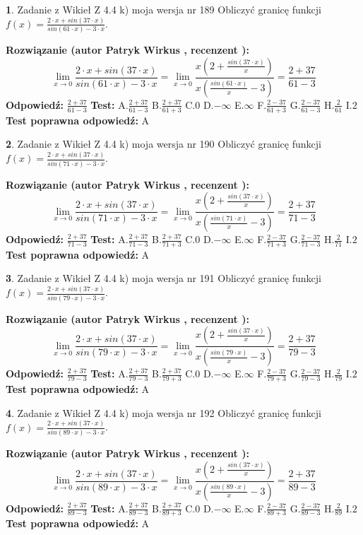 \documentclass[12pt, a4paper]{article}
\theoremstyle{definition} %
\newtheorem{zad}{}
\newcommand{\zadStart}[1]{\begin{zad}#1\newline}
\newcommand{\zadStop}{\end{zad}}
\newcommand{\rozwStart}[2]{\noindent \textbf{Rozwiązanie (autor #1 , recenzent #2): }\newline}
\newcommand{\rozwStop}{\newline}
\newcommand{\odpStart}{\noindent \textbf{Odpowiedź:}\newline}
\newcommand{\odpStop}{\newline}
\newcommand{\testStart}{\noindent \textbf{Test:}\newline}
\newcommand{\testStop}{\newline}
\newcommand{\kluczStart}{\noindent \textbf{Test poprawna odpowiedź:}\newline}
\newcommand{\kluczStop}{\newline}
\begin{document}
\zadStart{Zadanie z Wikieł Z 4.4 k) moja wersja nr 189}
Obliczyć granicę funkcji $f(x)=\frac{2\cdot x +sin(37\cdot x)}{sin(61\cdot x) -3\cdot x}$.
\zadStop
\rozwStart{Patryk Wirkus}{}
$$\lim\limits_{x\to 0}\frac{2\cdot x +sin(37\cdot x)}{sin(61\cdot x) -3\cdot x}
=\lim\limits_{x\to 0}\frac{x(2+\frac{sin(37\cdot x)}{x})}{x(\frac{sin(61\cdot x)}{x}-3)}
=\frac{2+37}{61-3}$$
\rozwStop
\odpStart
$\frac{2+37}{61-3}$
\odpStop
\testStart
A.$\frac{2+37}{61-3}$
B.$\frac{2+37}{61+3}$
C.$0$
D.$-\infty$
E.$\infty$
F.$\frac{2-37}{61+3}$
G.$\frac{2-37}{61-3}$
H.$\frac{2}{61}$
I.$2$
\testStop
\kluczStart
A
\kluczStop



\zadStart{Zadanie z Wikieł Z 4.4 k) moja wersja nr 190}
Obliczyć granicę funkcji $f(x)=\frac{2\cdot x +sin(37\cdot x)}{sin(71\cdot x) -3\cdot x}$.
\zadStop
\rozwStart{Patryk Wirkus}{}
$$\lim\limits_{x\to 0}\frac{2\cdot x +sin(37\cdot x)}{sin(71\cdot x) -3\cdot x}
=\lim\limits_{x\to 0}\frac{x(2+\frac{sin(37\cdot x)}{x})}{x(\frac{sin(71\cdot x)}{x}-3)}
=\frac{2+37}{71-3}$$
\rozwStop
\odpStart
$\frac{2+37}{71-3}$
\odpStop
\testStart
A.$\frac{2+37}{71-3}$
B.$\frac{2+37}{71+3}$
C.$0$
D.$-\infty$
E.$\infty$
F.$\frac{2-37}{71+3}$
G.$\frac{2-37}{71-3}$
H.$\frac{2}{71}$
I.$2$
\testStop
\kluczStart
A
\kluczStop



\zadStart{Zadanie z Wikieł Z 4.4 k) moja wersja nr 191}
Obliczyć granicę funkcji $f(x)=\frac{2\cdot x +sin(37\cdot x)}{sin(79\cdot x) -3\cdot x}$.
\zadStop
\rozwStart{Patryk Wirkus}{}
$$\lim\limits_{x\to 0}\frac{2\cdot x +sin(37\cdot x)}{sin(79\cdot x) -3\cdot x}
=\lim\limits_{x\to 0}\frac{x(2+\frac{sin(37\cdot x)}{x})}{x(\frac{sin(79\cdot x)}{x}-3)}
=\frac{2+37}{79-3}$$
\rozwStop
\odpStart
$\frac{2+37}{79-3}$
\odpStop
\testStart
A.$\frac{2+37}{79-3}$
B.$\frac{2+37}{79+3}$
C.$0$
D.$-\infty$
E.$\infty$
F.$\frac{2-37}{79+3}$
G.$\frac{2-37}{79-3}$
H.$\frac{2}{79}$
I.$2$
\testStop
\kluczStart
A
\kluczStop



\zadStart{Zadanie z Wikieł Z 4.4 k) moja wersja nr 192}
Obliczyć granicę funkcji $f(x)=\frac{2\cdot x +sin(37\cdot x)}{sin(89\cdot x) -3\cdot x}$.
\zadStop
\rozwStart{Patryk Wirkus}{}
$$\lim\limits_{x\to 0}\frac{2\cdot x +sin(37\cdot x)}{sin(89\cdot x) -3\cdot x}
=\lim\limits_{x\to 0}\frac{x(2+\frac{sin(37\cdot x)}{x})}{x(\frac{sin(89\cdot x)}{x}-3)}
=\frac{2+37}{89-3}$$
\rozwStop
\odpStart
$\frac{2+37}{89-3}$
\odpStop
\testStart
A.$\frac{2+37}{89-3}$
B.$\frac{2+37}{89+3}$
C.$0$
D.$-\infty$
E.$\infty$
F.$\frac{2-37}{89+3}$
G.$\frac{2-37}{89-3}$
H.$\frac{2}{89}$
I.$2$
\testStop
\kluczStart
A
\kluczStop
\end{document}
